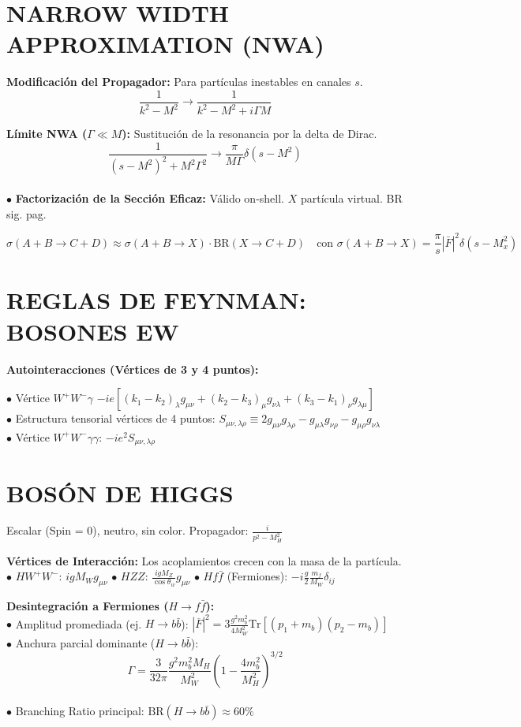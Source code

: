 \section{NARROW WIDTH APPROXIMATION (NWA)}
\textbf{Modificación del Propagador:} Para partículas inestables en canales $s$.
$$ \frac{1}{k^2 - M^2} \longrightarrow \frac{1}{k^2 - M^2 + i\Gamma M} $$

\textbf{Límite NWA ($\Gamma \ll M$):} Sustitución de la resonancia por la delta de Dirac.
$$ \frac{1}{(s - M^2)^2 + M^2 \Gamma^2} \longrightarrow \frac{\pi}{M\Gamma} \delta(s - M^2) $$ 
\\ $\bullet$ \textbf{Factorización de la Sección Eficaz:} Válido on-shell. $X$ partícula virtual. BR sig. pag. 

$$ \sigma(A+B \to C+D) \approx \sigma(A+B \to X) \cdot \text{BR}(X \to C+D) \quad \text{con } \sigma(A+B\to X) =\frac{\pi}{s}|\bar{F}|^2\delta (s-M_x^2)$$

\section{REGLAS DE FEYNMAN: BOSONES EW}
\textbf{Autointeracciones (Vértices de 3 y 4 puntos):}

$\bullet$ Vértice $W^+ W^- \gamma$ $ -ie \left[ (k_1-k_2)_\lambda g_{\mu\nu} + (k_2-k_3)_\mu g_{\nu\lambda} + (k_3-k_1)_\nu g_{\lambda\mu} \right] $ 
\\ $\bullet$ Estructura tensorial vértices de 4 puntos: $ S_{\mu\nu,\lambda\rho} \equiv 2g_{\mu\nu}g_{\lambda\rho} - g_{\mu\lambda}g_{\nu\rho} - g_{\mu\rho}g_{\nu\lambda} $
\\ $\bullet$ Vértice $W^+ W^- \gamma \gamma$: $-i e^2 S_{\mu\nu,\lambda\rho}$ 

\section{BOSÓN DE HIGGS}
Escalar (Spin = 0), neutro, sin color. Propagador: $\frac{i}{p^2 - M_H^2}$ 

\textbf{Vértices de Interacción:} Los acoplamientos crecen con la masa de la partícula.
\\ $\bullet$ $H W^+ W^-$: $ig M_W g_{\mu\nu}$ \qquad $\bullet$ $H Z Z$: $\frac{ig M_Z}{\cos\theta_w} g_{\mu\nu}$ \qquad $\bullet$ $H f \bar{f}$ (Fermiones): $-i \frac{g}{2} \frac{m_f}{M_W} \delta_{ij}$ 

\textbf{Desintegración a Fermiones ($H \to f\bar{f}$):} 
\\ $\bullet$ Amplitud promediada (ej. $H \to b\bar{b}$): $|\overline{F}|^2 = 3 \frac{g^2 m_b^2}{4 M_W^2} \text{Tr}[(p_1+m_b)(p_2-m_b)]$ 
\\ $\bullet$ Anchura parcial dominante ($H \to b\bar{b}$): 
$$ \Gamma = \frac{3}{32\pi} \frac{g^2 m_b^2 M_H}{M_W^2} \left(1 - \frac{4m_b^2}{M_H^2}\right)^{3/2} $$ 
\\ $\bullet$ Branching Ratio principal: $\text{BR}(H \to b\bar{b}) \approx 60\%$ 

